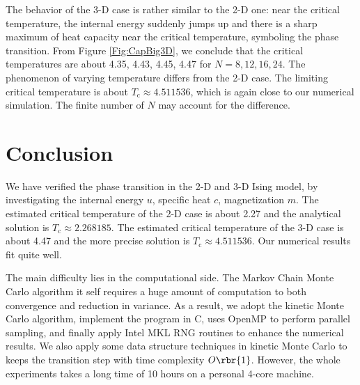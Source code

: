 \documentclass[english, nochinese]{pnote}
\begin{document}
The behavior of the 3-D case is rather similar to the 2-D one: near the critical temperature, the internal energy suddenly jumps up and there is a sharp maximum of heat capacity near the critical temperature, symboling the phase transition. From Figure \ref{Fig:CapBig3D}, we conclude that the critical temperatures are about 4.35, 4.43, 4.45, 4.47 for $ N = 8, 12, 16, 24 $. The phenomenon of varying temperature differs from the 2-D case. The limiting critical temperature is about $ T_{\text{c}} \approx 4.511536 $, which is again close to our numerical simulation. The finite number of $N$ may account for the difference.

\section{Conclusion}

We have verified the phase transition in the 2-D and 3-D Ising model, by investigating the internal energy $u$, specific heat $c$, magnetization $m$. The estimated critical temperature of the 2-D case is about 2.27 and the analytical solution is $ T_{\text{c}} \approx 2.268185 $. The estimated critical temperature of the 3-D case is about 4.47 and the more precise solution is $ T_{\text{c}} \approx 4.511536 $. Our numerical results fit quite well.

The main difficulty lies in the computational side. The Markov Chain Monte Carlo algorithm it self requires a huge amount of computation to both convergence and reduction in variance. As a result, we adopt the kinetic Monte Carlo algorithm, implement the program in C, uses OpenMP to perform parallel sampling, and finally apply Intel MKL RNG routines to enhance the numerical results. We also apply some data structure techniques in kinetic Monte Carlo to keeps the transition step with time complexity $ O \rbr{1} $. However, the whole experiments takes a long time of 10 hours on a personal 4-core machine.
\end{document}
